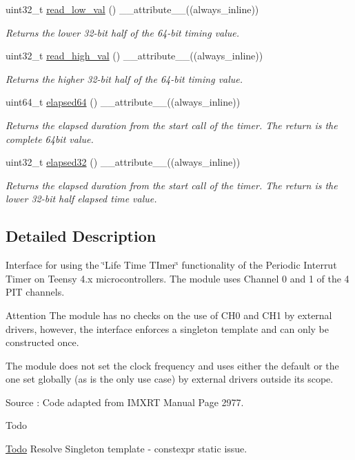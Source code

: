 \begin{DoxyCompactItemize}
uint32\+\_\+t \hyperlink{classPIT__LifetimeTimer_a4f7f8cd3847b9edb19dfa27f048a08cc}{read\+\_\+low\+\_\+val} () \+\_\+\+\_\+attribute\+\_\+\+\_\+((always\+\_\+inline))
\begin{DoxyCompactList}\small\item\em Returns the lower 32-\/bit half of the 64-\/bit timing value. \end{DoxyCompactList}\item 
uint32\+\_\+t \hyperlink{classPIT__LifetimeTimer_a39b0861ac88aec5e53f326409d536bcf}{read\+\_\+high\+\_\+val} () \+\_\+\+\_\+attribute\+\_\+\+\_\+((always\+\_\+inline))
\begin{DoxyCompactList}\small\item\em Returns the higher 32-\/bit half of the 64-\/bit timing value. \end{DoxyCompactList}\item 
uint64\+\_\+t \hyperlink{classPIT__LifetimeTimer_a04adf2272a47d4c81a28c6363e2da4fd}{elapsed64} () \+\_\+\+\_\+attribute\+\_\+\+\_\+((always\+\_\+inline))
\begin{DoxyCompactList}\small\item\em Returns the elapsed duration from the start call of the timer. The return is the complete 64bit value. \end{DoxyCompactList}\item 
uint32\+\_\+t \hyperlink{classPIT__LifetimeTimer_af7481214070333f845a23456b4d75880}{elapsed32} () \+\_\+\+\_\+attribute\+\_\+\+\_\+((always\+\_\+inline))
\begin{DoxyCompactList}\small\item\em Returns the elapsed duration from the start call of the timer. The return is the lower 32-\/bit half elapsed time value. \end{DoxyCompactList}\end{DoxyCompactItemize}


\subsection{Detailed Description}
Interface for using the \char`\"{}\+Life Time T\+Imer\char`\"{} functionality of the Periodic Interrut Timer on Teensy 4.\+x microcontrollers. The module uses Channel 0 and 1 of the 4 P\+IT channels. 

\begin{DoxyAttention}{Attention}
The module has no checks on the use of C\+H0 and C\+H1 by external drivers, however, the interface enforces a singleton template and can only be constructed once. 

The module does not set the clock frequency and uses either the default or the one set globally (as is the only use case) by external drivers outside its scope. 

Source \+: Code adapted from I\+M\+X\+RT Manual Page 2977. 
\end{DoxyAttention}
\begin{DoxyRefDesc}{Todo}
\item[\hyperlink{todo__todo000002}{Todo}]Resolve Singleton template -\/ constexpr static issue. \end{DoxyRefDesc}


